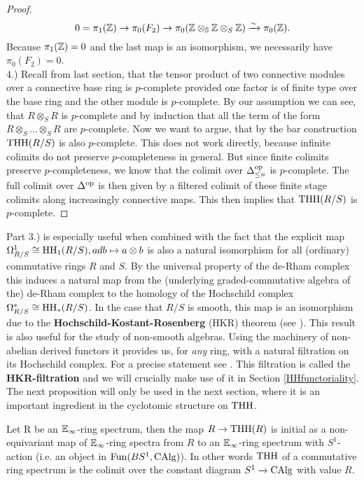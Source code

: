\begin{proof}
    \begin{equation*}
        0=\pi_1(\mathbb{Z})\to \pi_0(F_2)\to \pi_0(\mathbb{Z}\otimes_{\mathbb{S}}\mathbb{Z}\otimes_S\mathbb{Z})\xrightarrow{\sim} \pi_0(\mathbb{Z}).
    \end{equation*}
    Because $\pi_1(\mathbb{Z})=0$ and the last map is an isomorphism, we necessarily have $\pi_0(F_2)=0$. \\
    4.) Recall from last section, that the tensor product of two connective modules over a connective base ring is $p$-complete provided one factor is of finite type over the base ring and the other module is $p$-complete. By our assumption we can see, that $R\otimes_S R$ is $p$-complete and by induction that all the term of the form $R\otimes_S \dots \otimes_S R$ are $p$-complete. Now we want to argue, that by the bar construction $\operatorname{THH}(R/S)$ is also $p$-complete. This does not work directly, because infinite colimits do not preserve $p$-completeness in general. But since finite colimits preserve $p$-completeness, we know that the colimit over $\Delta^{\operatorname{op}}_{\leq n}$ is $p$-complete. The full colimit over $\Delta^{\operatorname{op}}$ is then given by a filtered colimit of these finite stage colimits along increasingly connective maps. This then implies that $\operatorname{THH}(R/S)$ is $p$-complete.
\end{proof}
Part 3.) is especially useful when combined with the fact that the explicit map $\Omega^1_{R/S} \cong \operatorname{HH}_1(R/S), adb\mapsto a\otimes b$ is also a natural isomorphism for all (ordinary) commutative rings $R$ and $S$. By the universal property of the de-Rham complex this induces a natural map from the (underlying graded-commutative algebra of the) de-Rham complex to the homology of the Hochschild complex $\Omega^{*}_{R/S} \cong \operatorname{HH}_*(R/S)$. 
In the case that $R/S$ is smooth, this map is an isomorphism due to the \textbf{Hochschild-Kostant-Rosenberg} (HKR) theorem (see \cite[Section~3.4]{loday2013cyclic}). 
This result is also useful for the study of non-smooth algebras. Using the machinery of non-abelian derived functors it provides us, for \textit{any} ring, with a natural filtration on its Hochschild complex. For a precise statement see \cite[Proposition~IV.4.1]{NS}. This filtration is called the \textbf{HKR-filtration} and we will crucially make use of it in Section \ref{HHfunctoriality}. 
\\
The next proposition will only be used in the next section, where it is an important ingredient in the cyclotomic structure on $\operatorname{THH}$.
\begin{prop}\cite{mcclureschwaenzlvogt}
\label{McClureSchwaenzlVogt}
Let R be an $\mathbb{E}_\infty$-ring spectrum, then the map $R\rightarrow \operatorname{THH}(R)$ is initial as a non-equivariant map of $\mathbb{E}_\infty$-ring spectra from $R$ to an $\mathbb{E}_\infty$-ring spectrum with $S^1$-action (i.e. an object in $\operatorname{Fun}(BS^1,\operatorname{CAlg})$). In other words $\operatorname{THH}$ of a commutative ring spectrum is the colimit over the constant diagram $S^1\rightarrow \operatorname{CAlg}$ with value $R$.
\end{prop}
